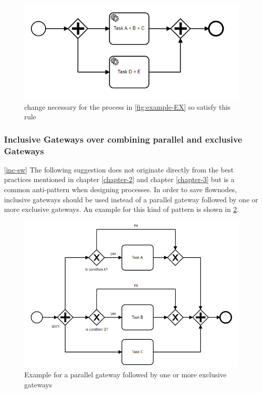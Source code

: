 \begin{figure}[H]
	\centering
	\includegraphics[width=0.7\columnwidth]{graphics/merge-suggestion-2}
	\caption{change necessary for the process in \ref{fig:example-EX} so satisfy this rule} 
	\label{fig:example-EX-fix} 
\end{figure}

\subsubsection{Inclusive Gateways over combining parallel and exclusive Gateways}\ref{inc-sw}
The following suggestion does not originate directly from the best practices mentioned in chapter \ref{chapter-2} and chapter \ref{chapter-3} but is a common anti-pattern when designing processes.
In order to save flownodes, inclusive gateways should be used instead of a parallel gateway followed by one or more exclusive gateways. An example for this kind of pattern is shown in \ref{fig:example-GW}.

\begin{figure}[H]
	\centering
	\includegraphics[width=0.9\columnwidth]{graphics/exclusive-suggestion-1}
	\caption{Example for a parallel gateway followed by one or more exclusive gateways} 
	\label{fig:example-GW} 
\end{figure}

